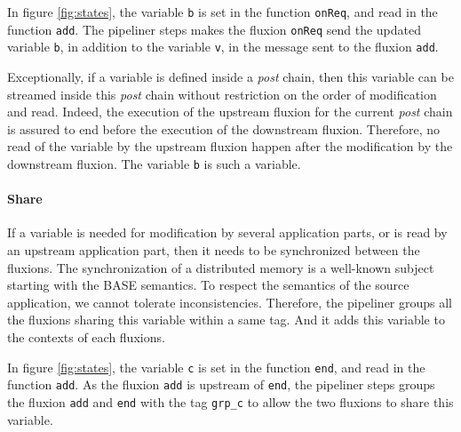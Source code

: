 In figure \ref{fig:states}, the variable \texttt{b} is set in the function \texttt{onReq}, and read in the function \texttt{add}.
The pipeliner steps makes the fluxion \texttt{onReq} send the updated variable \texttt{b}, in addition to the variable \texttt{v}, in the message sent to the fluxion \texttt{add}.

Exceptionally, if a variable is defined inside a \textit{post} chain, then this variable can be streamed inside this \textit{post} chain without restriction on the order of modification and read.
Indeed, the execution of the upstream fluxion for the current \textit{post} chain is assured to end before the execution of the downstream fluxion.
Therefore, no read of the variable by the upstream fluxion happen after the modification by the downstream fluxion. 
The variable \texttt{b} is such a variable. 



\paragraph{Share}
If a variable is needed for modification by several application parts, or is read by an upstream application part, then it needs to be synchronized between the fluxions.
The synchronization of a distributed memory is a well-known subject starting with %
the BASE semantics\cite{Fox1997}.
To respect the semantics of the source application, we cannot tolerate inconsistencies.
Therefore, the pipeliner groups all the fluxions sharing this variable within a same tag.
And it adds this variable to the contexts of each fluxions.

In figure \ref{fig:states}, the variable \texttt{c} is set in the function \texttt{end}, and read in the function \texttt{add}.
As the fluxion \texttt{add} is upstream of \texttt{end}, the pipeliner steps groups the fluxion \texttt{add} and \texttt{end} with the tag \texttt{grp\_c} to allow the two fluxions to share this variable.

